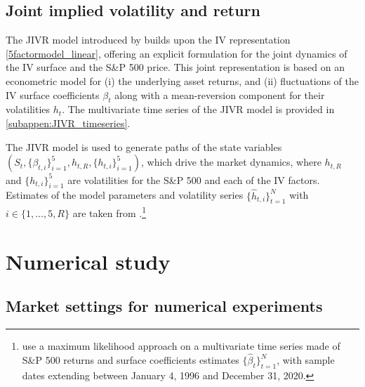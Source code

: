 \documentclass[12pt]{article}
\begin{document}
\subsection{Joint implied volatility and return}\label{subsec:JIVR}

The JIVR model introduced by \cite{Frnacois2023} builds upon the IV representation \eqref{5factormodel_linear}, offering an explicit formulation for the joint dynamics of the IV surface and the S\&P 500 price. This joint representation is based on an econometric model for (i) the underlying asset returns, and (ii) fluctuations of the IV surface coefficients $\beta_{t}$ along with a mean-reversion component for their volatilities $h_{t}$. The multivariate time series of the JIVR model is provided in \cref{subappen:JIVR_timeseries}.

The JIVR model is used to generate paths of the state variables $(S_{t},\{\beta_{t,i} \}^5_{i=1}, h_{t,R}, \{ h_{t,i}\}^5_{i=1})$, which drive the market dynamics, where $h_{t,R}$ and $\{ h_{t,i}\}^5_{i=1}$ are volatilities for the S\&P 500 and each of the IV factors. 
Estimates of the model parameters and volatility series $\{ \hat{h}_{t,i}\}_{t=1}^{N}$ with $i\in \{1,\ldots,5,R\}$ are taken from \cite{Frnacois2023}.\footnote{
    \cite{Frnacois2023} use a maximum likelihood approach on a multivariate time series made of S\&P 500 returns and surface coefficients estimates $\{ \hat{\beta}_{t}\}_{t=1}^{N}$, with sample dates extending between January 4, 1996 and December 31, 2020.}



\section{Numerical study}\label{se:SSG}

\subsection{Market settings for numerical experiments}\label{subsec:market_parameters}
\end{document}

